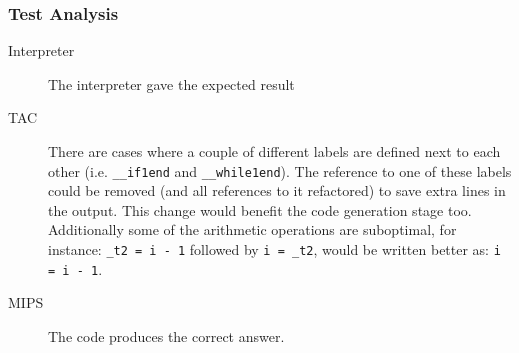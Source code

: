 \subsubsection{Test Analysis}
\begin{description}
	\item[Interpreter] The interpreter gave the expected result
	\item[TAC] There are cases where a couple of different labels are defined next to each other (i.e. \verb!__if1end! and \verb!__while1end!). The reference to one of these labels could be removed (and all references to it refactored) to save extra lines in the output. This change would benefit the code generation stage too. Additionally some of the arithmetic operations are suboptimal, for instance: \verb!_t2 = i - 1! followed by \verb!i = _t2!, would be written better as: \verb!i = i - 1!.
	\item[MIPS] The code produces the correct answer.
\end{description}

